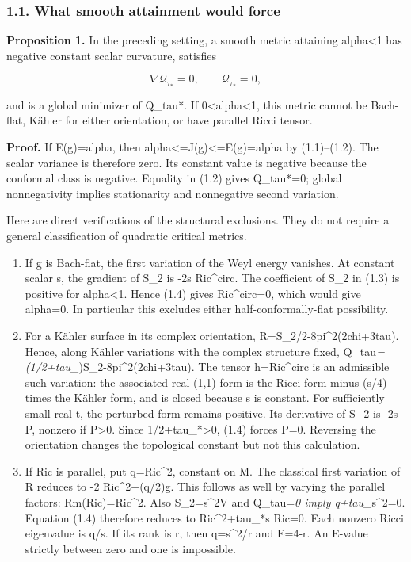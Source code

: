 \documentclass[
  10pt,
]{article}
\begin{document}
\hypertarget{what-smooth-attainment-would-force}{%
\subsubsection{1.1. What smooth attainment would
force}\label{what-smooth-attainment-would-force}}

\textbf{Proposition 1.} In the preceding setting, a smooth metric
attaining alpha\textless1 has negative constant scalar curvature,
satisfies

\[
 \nabla\mathcal Q_{\tau_*}=0,\qquad
 \mathcal Q_{\tau_*}=0,                              \tag{1.4}
\]

and is a global minimizer of Q\_tau*. If 0\textless alpha\textless1,
this metric cannot be Bach-flat, Kähler for either orientation, or have
parallel Ricci tensor.

\textbf{Proof.} If E(g)=alpha, then
alpha\textless=J(g)\textless=E(g)=alpha by (1.1)--(1.2). The scalar
variance is therefore zero. Its constant value is negative because the
conformal class is negative. Equality in (1.2) gives Q\_tau*=0; global
nonnegativity implies stationarity and nonnegative second variation.

Here are direct verifications of the structural exclusions. They do not
require a general classification of quadratic critical metrics.

\begin{enumerate}
\def\labelenumi{\arabic{enumi}.}
\item
  If g is Bach-flat, the first variation of the Weyl energy vanishes. At
  constant scalar s, the gradient of S\_2 is -2s Ric\^{}circ. The
  coefficient of S\_2 in (1.3) is positive for alpha\textless1. Hence
  (1.4) gives Ric\^{}circ=0, which would give alpha=0. In particular
  this excludes either half-conformally-flat possibility.
\item
  For a Kähler surface in its complex orientation,
  R=S\_2/2-8pi\^{}2(2chi+3tau). Hence, along Kähler variations with the
  complex structure fixed,
  Q\_tau\emph{=(1/2+tau\_})S\_2-8pi\^{}2(2chi+3tau). The tensor
  h=Ric\^{}circ is an admissible such variation: the associated real
  (1,1)-form is the Ricci form minus (s/4) times the Kähler form, and is
  closed because s is constant. For sufficiently small real t, the
  perturbed form remains positive. Its derivative of S\_2 is -2s P,
  nonzero if P\textgreater0. Since 1/2+tau\_*\textgreater0, (1.4) forces
  P=0. Reversing the orientation changes the topological constant but
  not this calculation.
\item
  If Ric is parallel, put q=\textbar Ric\textbar\^{}2, constant on M.
  The classical first variation of R reduces to -2 Ric\^{}2+(q/2)g. This
  follows as well by varying the parallel factors: Rm(Ric)=Ric\^{}2.
  Also S\_2=s\^{}2V and Q\_tau\emph{=0 imply q+tau\_}s\^{}2=0. Equation
  (1.4) therefore reduces to Ric\^{}2+tau\_*s Ric=0. Each nonzero Ricci
  eigenvalue is q/s. If its rank is r, then q=s\^{}2/r and E=4-r. An
  E-value strictly between zero and one is impossible.
\end{enumerate}
\end{document}
